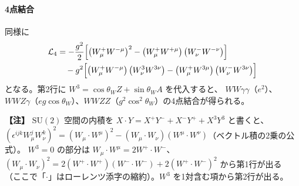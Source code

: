 \documentclass[uplatex,dvipdfmx,a4paper,11pt,openany]{jsbook}
\newenvironment{note}{\vspace{1ex}\par\footnotesize\noindent\textbf{【注】}}{\par\vspace{1ex}}
\numberwithin{equation}{chapter}
\theoremstyle{definition}
\theoremstyle{plain}
\theoremstyle{remark}
\newcommand{\Lag}{\mathcal{L}}
\newcommand{\SU}{\mathrm{SU}}
\begin{document}
\paragraph{4点結合}
同様に
\begin{align}
\Lag_4&=-\frac{g^2}{2}\Bigl[\left(W^+_\mu W^{-\mu}\right)^2-\left(W^+_\mu W^{+\mu}\right)\left(W^-_\nu W^{-\nu}\right)\Bigr]\notag\\
&\quad-g^2\Bigl[\left(W^+_\mu W^{-\mu}\right)\left(W^3_\nu W^{3\nu}\right)-\left(W^+_\mu W^{3\mu}\right)\left(W^-_\nu W^{3\nu}\right)\Bigr]
\label{eq:quartic-gauge}
\end{align}
となる。第2行に $W^3=\cos\theta_WZ+\sin\theta_WA$ を代入すると、
$WW\gamma\gamma$（$e^2$）、$WWZ\gamma$（$eg\cos\theta_W$）、$WWZZ$（$g^2\cos^2\theta_W$）の4点結合が得られる。
\begin{note}
$\SU(2)$ 空間の内積を $X\cdot Y=X^+Y^-+X^-Y^++X^3Y^3$ と書くと、
$\left(\epsilon^{ijk}W^j_\mu W^k_\nu\right)^2=(W_\mu\cdot W^\mu)^2-(W_\mu\cdot W_\nu)(W^\mu\cdot W^\nu)$（ベクトル積の2乗の公式）。
$W^3=0$ の部分は $W_\mu\cdot W^\mu=2W^+\!\cdot W^-$、
$(W_\mu\cdot W_\nu)^2=2(W^+\!\cdot W^+)(W^-\!\cdot W^-)+2(W^+\!\cdot W^-)^2$ から第1行が出る
（ここで「$\cdot$」はローレンツ添字の縮約）。$W^3$ を1対含む項から第2行が出る。
\end{note}
\end{document}
